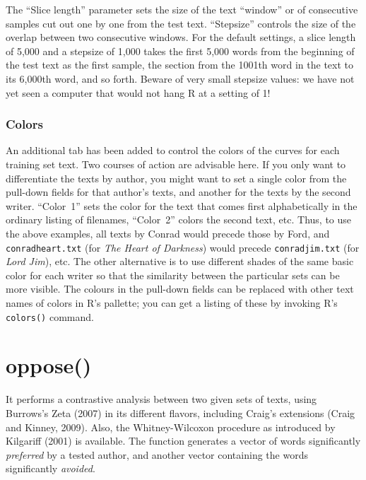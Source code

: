 \documentclass[11pt,a4paper]{article}
\def\underscore{\raisebox{-.8ex}{-}}
\def\code#1{{\tt #1}}
\begin{document}
The ``Slice length'' parameter sets the size of the text ``window''
or of consecutive samples cut out one by one from the test text. ``Stepsize''
controls the size of the overlap between two consecutive windows.
For the default settings, a slice length of 5,000 and a stepsize of
1,000 takes the first 5,000 words from the beginning of the test text
as the first sample, the section from the 1001th word in the text
to its 6,000th word, and so forth. Beware of very small stepsize values:
we have not yet seen a computer that would not hang R at a setting
of 1!


\subsubsection{Colors}

An additional tab has been added to control the colors of the curves
for each training set text. Two courses of action are advisable here.
If you only want to differentiate the texts by author, you might want
to set a single color from the pull-down fields for that author's
texts, and another for the texts by the second writer. ``Color~1''
sets the color for the text that comes first alphabetically in the
ordinary listing of filenames, ``Color~2'' colors the second text,
etc. Thus, to use the above examples, all texts by Conrad would precede
those by Ford, and \code{conrad\underscore{}heart.txt} (for \emph{The Heart of
Darkness}) would precede \code{conrad\underscore{}jim.txt} (for \emph{Lord Jim}),
etc. The other alternative is to use different shades of the same
basic color for each writer so that the similarity between the particular
sets can be more visible. The colours in the pull-down fields can
be replaced with other text names of colors in R's pallette; you can
get a listing of these by invoking R's \code{colors()} command.


\section{oppose()}

It performs a contrastive analysis between two given sets of texts,
using Burrows's Zeta (2007) in its different flavors, including Craig's
extensions (Craig and Kinney, 2009). Also, the Whitney-Wilcoxon procedure
as introduced by Kilgariff (2001) is available. The function generates
a vector of words significantly \textit{preferred} by a tested author, and
another vector containing the words significantly \textit{avoided}.
\end{document}
